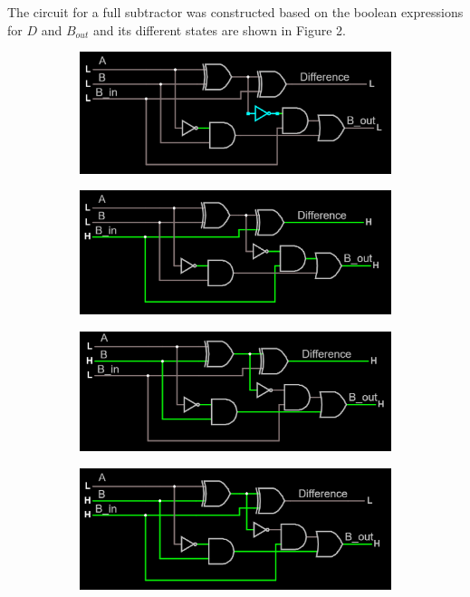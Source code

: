 \documentclass{article}
\begin{document}
	The circuit for a full subtractor was constructed based on the boolean expressions for $D$ and $B_{out}$ and its different states are shown in Figure 2.
	
	\begin{figure}[H]
		\centering
		\begin{subfigure}[t]{0.4\textwidth}
			\centering
			\includegraphics[width=\textwidth]{full_sub/full_sub_000.png}
		\end{subfigure}
		\begin{subfigure}[t]{.4\textwidth}
			\centering
			\includegraphics[width=\textwidth]{full_sub/full_sub_001.png}
		\end{subfigure}
		
		\begin{subfigure}[b]{0.4\textwidth}
			\centering
			\includegraphics[width=\textwidth]{full_sub/full_sub_010.png}
		\end{subfigure}
		\begin{subfigure}[b]{0.4\textwidth}
			\includegraphics[width=\textwidth]{full_sub/full_sub_011.png}
		\end{subfigure}
		

\end{figure}
\end{document}
